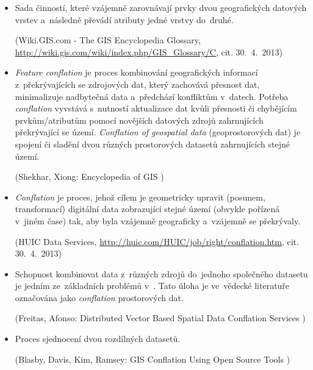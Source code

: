 \begin{itemize}

  \item Sada činností, které vzájemně zarovnávají prvky dvou geografických
    datových vrstev a~následně převádí atributy jedné vrstvy do~druhé.
    
    (Wiki.GIS.com - The GIS Encyclopedia Glossary, 
    \url{http://wiki.gis.com/wiki/index.php/GIS\_Glossary/C},
    cit. 30.~4.~2013)

  \item \textit{Feature conflation} je proces kombinování geografických 
    informací z~překrývajících se zdrojových dat, který zachovává přesnost 
    dat, minimalizuje nadbytečná data a~předchází konfliktům v~datech.
    Potřeba \textit{conflation} vyvstává s~nutností aktualizace dat kvůli
    přesnosti či chybějícím prvkům/atributům pomocí novějších datových zdrojů
    zahrnujících překrývající se území.
    \textit{Conflation of geospatial data} (geoprostorových dat) je spojení
    či sladění dvou různých prostorových datasetů zahrnujících stejné území.
     
    (Shekhar, Xiong: Encyclopedia of GIS \cite[][s.~129]{gisencyclopedia})

 \item \textit{Conflation} je proces, jehož cílem je geometricky upravit 
    (posunem, transformací) digitální data zobrazující stejné území 
    (obvykle pořízená v~jiném čase) tak, aby byla vzájemně geograficky 
     a~vzájemně se překrývaly.
    
    (HUIC Data Services, \url{http://huic.com/HUIC/job/right/conflation.htm}, 
     \linebreak cit. 30.~4.~2013)

  \item Schopnost kombinovat data z~různých zdrojů do~jednoho společného
    datasetu je jedním ze~základních problémů v~. Tato úloha je
    ve~vědecké literatuře označována jako \textit{conflation} prostorových
    dat.
   
    (Freitas, Afonso: Distributed Vector Based Spatial Data Conflation 
    Services \linebreak \cite[][s.~23]{freitas})

  \item Proces sjednocení dvou rozdílných datasetů.
    
    (Blasby, Davis, Kim, Ramsey: GIS Conflation Using Open Source Tools 
    \cite[][s.~2]{opensourceconflation})


\end{itemize}
